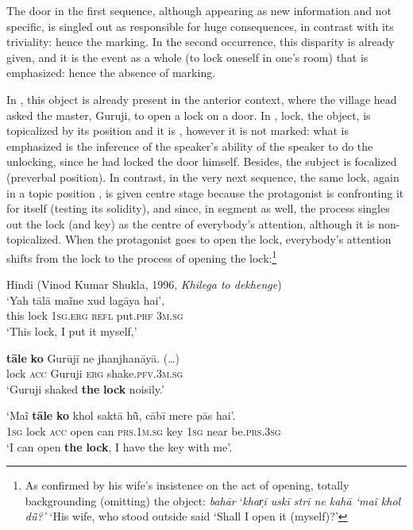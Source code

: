 \documentclass[output=paper]{LSP/langsci}
\begin{document}
The door in the first sequence, although appearing as new information and not specific, is singled out as responsible for huge consequences, in contrast with its triviality: hence the marking. In the second occurrence, this disparity is already given, and it is the event as a whole (to lock oneself in one’s room) that is emphasized: hence the absence of marking. 

In , this object is already present in the anterior context, where the village head asked the master, Guruji, to open a lock on a door. In , lock, the object, is topicalized by its position and it is , however it is not marked: what is emphasized is the inference of the speaker’s ability of the speaker to do the unlocking, since he had locked the door himself. Besides, the subject is focalized (preverbal position). In contrast, in the very next sequence, the same lock, again in a topic position , is given centre stage because the protagonist is confronting it for itself (testing its solidity), and since, in segment  as well, the process singles out the lock (and key) as the centre of everybody’s attention, although it is non-topicalized. When the protagonist goes to open the lock, everybody’s attention shifts from the lock to the process of opening the lock:\footnote{As confirmed by his wife’s insistence on the act of opening, totally backgrounding (omitting) the object: {\textit{bahār}}{} ‘\textit{khar̩ī uskī strī ne kahā ‘maĩ khol d\~{ū}?’} ‘His wife, who stood outside said ‘Shall I open it (myself)?’}

\ea Hindi (Vinod Kumar Shukla, 1996, \emph{Khilega to dekhenge}) \label{10-mo-ex:17}\\
\ea \label{10-mo-ex:17a}
\gll  ‘Yah tālā maĩne xud lagāya hai’,\\
this lock \textsc{1sg.erg} \textsc{refl} put.\textsc{prf} \textsc{3m.sg}\\
\glt ‘This lock, I put it myself,’

\ex \label{10-mo-ex:17b}
\gll \textbf{tāle} \textbf{ko} Gurūjī ne jhanjhanāyā. (…)\\
lock \textsc{acc} Guruji \textsc{erg} shake.\textsc{pfv.3m.sg}\\
\glt `Guruji shaked \textbf{the} \textbf{lock} noisily.'

\ex \label{10-mo-ex:17c}
\gll ‘Maĩ \textbf{tāle} \textbf{ko} khol saktā 	hū̃, cābī mere pās hai’.\\
 \textsc{1sg} lock \textsc{acc} open can \textsc{prs.1m.sg} key \textsc{1sg} near be.\textsc{prs.3sg}\\
\glt ‘I can open \textbf{the} \textbf{lock}, I have the key with me’.
\end{document}
